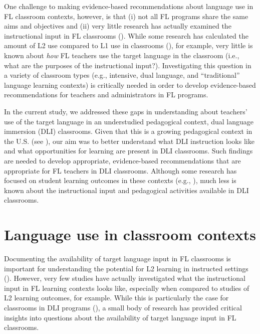 \documentclass[output=paper,chinesefont]{langscibook}
\begin{document}
One challenge to making evidence-based recommendations about language use in FL classroom contexts, however, is that (i) not all FL programs share the same aims and objectives and (ii) very little research has actually examined the instructional input in FL classrooms (\citealt{CollinsEtAl2012,Huensch2019,Macaro2001}). While some research has calculated the amount of L2 use compared to L1 use in classrooms (\citealt{DuffPolio1990}), for example, very little is known about \textit{how} FL teachers use the target language in the classroom (i.e., what are the purposes of the instructional input?). Investigating this question in a variety of classroom types (e.g., intensive, dual language, and ``traditional'' language learning contexts) is critically needed in order to develop evidence-based recommendations for teachers and administrators in FL programs.

In the current study, we addressed these gaps in understanding about teachers’ use of the target language in an understudied pedagogical context, dual language immersion (DLI) classrooms. Given that this is a growing pedagogical context in the U.S. (see \citealt{Commission2017,Valdes1997}), our aim was to better understand what DLI instruction looks like and what opportunities for learning are present in DLI classrooms. Such findings are needed to develop appropriate, evidence-based recommendations that are appropriate for FL teachers in DLI classrooms. Although some research has focused on student learning outcomes in these contexts (e.g., \citealt{BurkhauserEtAl2016,FortuneTedick2015}), much less is known about the instructional input and pedagogical activities available in DLI classrooms.

\section{Language use in classroom contexts}

Documenting the availability of target language input in FL classrooms is important for understanding the potential for L2 learning in instructed settings (\citealt{CollinsEtAl2012,DuffPolio1990,Huensch2019}). However, very few studies have actually investigated what the instructional input in FL learning contexts looks like, especially when compared to studies of L2 learning outcomes, for example. While this is particularly the case for classrooms in DLI programs (\citealt{Jia2017,LiEtAl2016}), a small body of research has provided critical insights into questions about the availability of target language input in FL classrooms.
\end{document}
